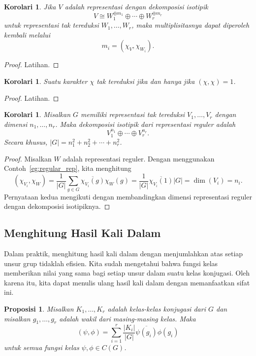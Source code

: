 \documentclass[12pt]{article}
\theoremstyle{plain}
\newtheorem{proposition}[theorem]{Proposisi}
\newtheorem{corollary}[theorem]{Korolari}
\theoremstyle{definition}
\theoremstyle{remark}
\numberwithin{equation}{section}
\begin{document}
\begin{corollary}
Jika $V$ adalah representasi dengan dekomposisi isotipik
\[
V \cong W_1^{\oplus m_1} \oplus \cdots \oplus W_r^{\oplus m_r}
\]
untuk representasi tak tereduksi $W_1, \ldots, W_r$,
maka multiplisitasnya dapat diperoleh kembali melalui
\[
m_i = \left( \chi_V, \chi_{W_i} \right).
\]
\end{corollary}

\begin{proof}
Latihan.
\end{proof}

\begin{corollary}
Suatu karakter $\chi$ tak tereduksi jika dan hanya jika $(\chi,\chi)=1$.
\end{corollary}

\begin{proof}
Latihan.
\end{proof}

\begin{corollary}
Misalkan $G$ memiliki representasi tak tereduksi $V_1,\ldots,V_r$
dengan dimensi $n_1,\ldots, n_r$. Maka dekomposisi isotipik dari
representasi reguler adalah
\[
V_1^{n_1} \oplus \cdots \oplus V_r^{n_r} .
\]
Secara khusus, $|G|=n_1^2 + n_2^2 + \cdots + n_r^2$.
\end{corollary}

\begin{proof}
Misalkan $W$ adalah representasi reguler.
Dengan menggunakan Contoh~\ref{eg:regular_rep}, kita menghitung
\[
( \chi_{V_i} , \chi_W ) = \frac{1}{|G|}
\sum_{g \in G} \overline{\chi_{V_i}(g)} \chi_W(g)
= \frac{1}{|G|} \overline{\chi_{V_i}(1)} |G|
= \dim(V_i)=n_i.
\]
Pernyataan kedua mengikuti dengan membandingkan dimensi
representasi reguler dengan dekomposisi isotipiknya.
\end{proof}

\subsection{Menghitung Hasil Kali Dalam}

Dalam praktik, menghitung hasil kali dalam dengan menjumlahkan atas
setiap unsur grup tidaklah efisien. Kita sudah mengetahui bahwa fungsi kelas
memberikan nilai yang sama bagi setiap unsur dalam suatu kelas konjugasi.
Oleh karena itu, kita dapat menulis ulang hasil kali dalam dengan memanfaatkan
sifat ini.

\begin{proposition}
Misalkan $K_1, \ldots, K_r$ adalah kelas-kelas konjugasi dari $G$
dan misalkan $g_1,\ldots, g_r$ adalah wakil dari masing-masing kelas.
Maka
\[
( \psi, \phi ) = \sum_{i=1}^r \frac{|K_i|}{|G|}
\overline{\psi(g_i)}\phi(g_i)
\]
untuk semua fungsi kelas $\psi,\phi \in C(G)$.
\end{proposition}
\end{document}
